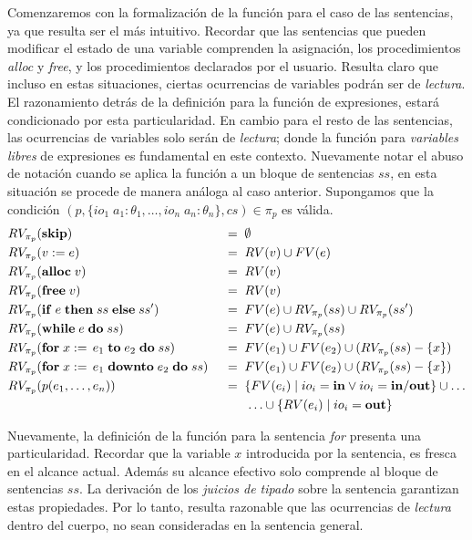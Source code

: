 Comenzaremos con la formalización de la función para el caso de las sentencias, ya que resulta ser el más intuitivo.
Recordar que las sentencias que pueden modificar el estado de una variable comprenden la asignación, los procedimientos \textit{alloc} y \textit{free}, y los procedimientos declarados por el usuario.
Resulta claro que incluso en estas situaciones, ciertas ocurrencias de variables podrán ser de \textit{lectura}.
El razonamiento detrás de la definición para la función de expresiones, estará condicionado por esta particularidad.
En cambio para el resto de las sentencias, las ocurrencias de variables solo serán de \textit{lectura}; donde la función para \textit{variables libres} de expresiones es fundamental en este contexto.
Nuevamente notar el abuso de notación cuando se aplica la función a un bloque de sentencias $ss$, en esta situación se procede de manera análoga al caso anterior.
Supongamos que la condición $(p, \{ io_1 \; a_1: \theta_1, \ldots, io_n \; a_n: \theta_n \}, cs) \in \pi_{p}$ es válida.
\begin{alignat*}{2}
&RV_{\pi_{p}}(\mathbf{skip})
&&\;=\;
\emptyset
\\
&RV_{\pi_{p}}(v := e)
&&\;=\;
RV(v) \cup FV(e)
\\
&RV_{\pi_{p}}(\mathbf{alloc} \; v)
&&\;=\;
RV(v)
\\
&RV_{\pi_{p}}(\mathbf{free} \; v)
&&\;=\;
RV(v)
\\
&RV_{\pi_{p}}(\mathbf{if} \; e \; \mathbf{then} \; ss \; \mathbf{else} \; ss')
&&\;=\;
FV(e) \cup RV_{\pi_{p}}(ss) \cup RV_{\pi_{p}}(ss')
\\
&RV_{\pi_{p}}(\mathbf{while} \; e \; \mathbf{do} \; ss)
&&\;=\;
FV(e) \cup RV_{\pi_{p}}(ss)
\\
&RV_{\pi_{p}}(\mathbf{for} \; x := \, e_1 \; \mathbf{to} \; e_2 \; \mathbf{do} \; ss)
&&\;=\;
FV(e_1) \cup FV(e_2) \cup (RV_{\pi_{p}}(ss) - \{ x \})
\\
&RV_{\pi_{p}}(\mathbf{for} \; x := \, e_1 \; \mathbf{downto} \; e_2 \; \mathbf{do} \; ss)
&&\;=\;
FV(e_1) \cup FV(e_2) \cup (RV_{\pi_{p}}(ss) - \{ x \})
\\
&RV_{\pi_{p}}(p(e_1, \ldots, e_n))
&&\;=\;
\{ FV(e_i) \mid io_i = \mathbf{in} \vee io_i = \mathbf{in/out} \}
\cup \ldots
\\&&&\qquad
\ldots \cup
\{ RV(e_i) \mid io_i = \mathbf{out} \}
\end{alignat*}

Nuevamente, la definición de la función para la sentencia \textit{for} presenta una particularidad.
Recordar que la variable $x$ introducida por la sentencia, es fresca en el alcance actual.
Además su alcance efectivo solo comprende al bloque de sentencias $ss$.
La derivación de los \textit{juicios de tipado} sobre la sentencia garantizan estas propiedades.
Por lo tanto, resulta razonable que las ocurrencias de \textit{lectura} dentro del cuerpo, no sean consideradas en la sentencia general.

